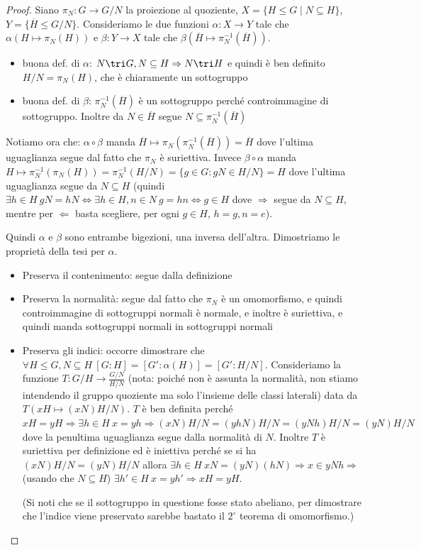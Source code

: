\begin{proof}
    Siano $\pi_N: G \rightarrow G/N$ la proiezione al quoziente, $X  = \{ H \leq G \mid N \subseteq H \}$, $Y = \{ \overline H \leq G/N \}$. Consideriamo le due funzioni $\alpha: X \rightarrow Y$ tale che $\alpha(H \mapsto \pi_N(H))$ e $\beta: Y \rightarrow X$ tale che $\beta( \overline H \mapsto \pi_N^{-1}(\overline H) )$. 
    \begin{itemize}
        \item buona def. di $\alpha$: $N \tri G, N \subseteq H \Rightarrow N \tri H$ e quindi è ben definito $H/N = \pi_N(H)$, che è chiaramente un sottogruppo
        \item buona def. di $\beta$: $\pi_N^{-1}(\overline H)$ è un sottogruppo perché controimmagine di sottogruppo. Inoltre da $N \in \overline H$ segue $N \subseteq \pi_N^{-1}(\overline H)$
    \end{itemize}
    Notiamo ora che: $\alpha \circ \beta$ manda $\overline H \mapsto  \pi_N(\pi_N^{-1}(\overline H)) = \overline H$ dove l'ultima uguaglianza segue dal fatto che $\pi_N$ è suriettiva. Invece $ \beta \circ \alpha$ manda 
    $H \mapsto  \pi_N^{-1}(\pi_N(H)) = \pi_N^{-1}(H/N) = \{g \in G : gN \in H/N \} =  H$
    dove l'ultima uguaglianza segue da $N \subseteq H$ (quindi $\exists h \in H \ gN = hN \iff \exists h \in H, n \in N \  g = hn \iff g \in H$ dove $\Rightarrow$ segue da $N \subseteq H$, mentre per $\Leftarrow$ basta scegliere, per ogni $g \in H$, $h = g, n = e$).
    
    Quindi $\alpha$ e $\beta$ sono entrambe bigezioni, una inversa dell'altra. Dimostriamo le proprietà della tesi per $\alpha$.
    \begin{itemize}
        \item Preserva il contenimento: segue dalla definizione
        \item Preserva la normalità: segue dal fatto che $\pi_N$ è un omomorfismo, e quindi controimmagine di sottogruppi normali è normale, e inoltre è suriettiva, e quindi manda sottogruppi normali in sottogruppi normali
        \item Preserva gli indici:  occorre dimostrare che $\forall H \leq G , N \subseteq H \ [G:H] = [G' : \alpha(H)] = [G' : H/N]$. Consideriamo la funzione $T: G/H \rightarrow \frac{G/N}{H/N}$ (nota: poiché non è assunta la normalità, non stiamo intendendo il gruppo quoziente ma solo l'insieme delle classi laterali) data da $T(xH \mapsto (xN)H/N)$. $T$ è ben definita perché $xH = yH \Rightarrow \exists h \in H \ x = yh \Rightarrow (xN)H/N = (yhN)H/N = (yNh)H/N = (yN)H/N$ dove la penultima uguaglianza segue dalla normalità di $N$. Inoltre $T$ è suriettiva per definizione ed è iniettiva perché se si ha $(xN)H/N = (yN)H/N$ allora $\exists h \in H \ xN = (yN) (hN) \Rightarrow x \in yNh \Rightarrow$ (usando che $N\subseteq H$) $\exists h' \in H \ x = yh' \Rightarrow xH = yH$.
        
        (Si noti che se il sottogruppo in questione fosse stato abeliano, per dimostrare che l'indice viene preservato sarebbe bastato il $2^{\circ}$ teorema di omomorfismo.)
    \end{itemize}
\end{proof}
